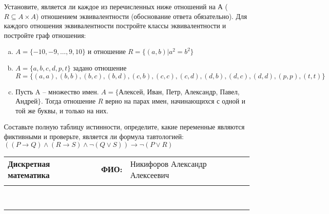 \documentclass[10pt]{exam}
\newcommand{\class}{Дискретная математика}
\newcommand{\examdate}{}
\begin{document}
\begin{questions}
\question
Установите, является ли каждое из перечисленных ниже отношений на А ($R \subseteq A \times A$) отношением эквивалентности (обоснование ответа обязательно). Для каждого отношения эквивалентности постройте классы 
эквивалентности и постройте граф отношения:
\begin{enumerate} [a)]\setcounter{enumi}{0}
\item $A = \{-10, -9, … , 9, 10\}$ и отношение $R = \{(a,b)|a^{2} = b^{2}\}$
\item $A = \{a, b, c, d, p, t\}$ задано отношение $R = \{(a, a), (b, b), (b, c), (b, d), (c, b), (c, c), (c, d), (d, b), (d, c), (d, d), (p,p), (t,t)\}$
\item Пусть A – множество имен. $A = \{ $Алексей, Иван, Петр, Александр, Павел, Андрей$ \}$. Тогда отношение $R$ верно на парах имен, начинающихся с одной и той же буквы, и только на них.
\end{enumerate}\question Составьте полную таблицу истинности, определите, какие переменные являются фиктивными и проверьте, является ли формула тавтологией:
$((P \rightarrow Q) \land (R \rightarrow S) \land \neg (Q \lor S)) \rightarrow \neg (P \lor R)$

\end{questions}
\newpage
\begin{flushright}
\begin{tabular}{p{2.8in} r l}
\textbf{\class} & \textbf{ФИО:} &Никифоров Александр Алексеевич
\\

\textbf{\examdate} &&\\
\end{tabular}\\
\end{flushright}
\rule[1ex]{\textwidth}{.1pt}
\end{document}
